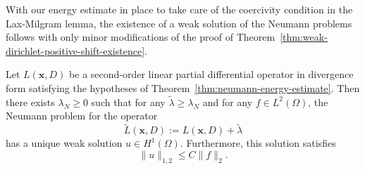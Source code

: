With our energy estimate in place to take care of the coercivity condition in the Lax-Milgram lemma, the existence of a weak solution of the Neumann problems follows with only minor modifications of the proof of Theorem~\ref{thm:weak-dirichlet-positive-shift-existence}.

\begin{Theorem}
\label{thm:neumann-positive-shift-weak-existence}
Let $L(\bm{x},D)$ be a second-order linear partial differential operator in divergence form satisfying the hypotheses of Theorem~\ref{thm:neumann-energy-estimate}. Then there exists $\lambda_N\geq0$ such that for any $\widetilde\lambda\geq\lambda_N$ and for any $f\in L^2(\Omega)$, the Neumann problem for the operator
\begin{equation}\label{eq:neumann-positive-shifted-operator}
\widetilde L(\bm{x},D):=L(\bm{x},D)+\widetilde\lambda
\end{equation}
has a unique weak solution $u\in H^1(\Omega)$. Furthermore, this solution satisfies
\begin{equation}\label{eq:neumann-weak-solution-l2-data-bound}
\|u\|_{1,2}\leq C\|f\|_2.
\end{equation}

\end{Theorem}
